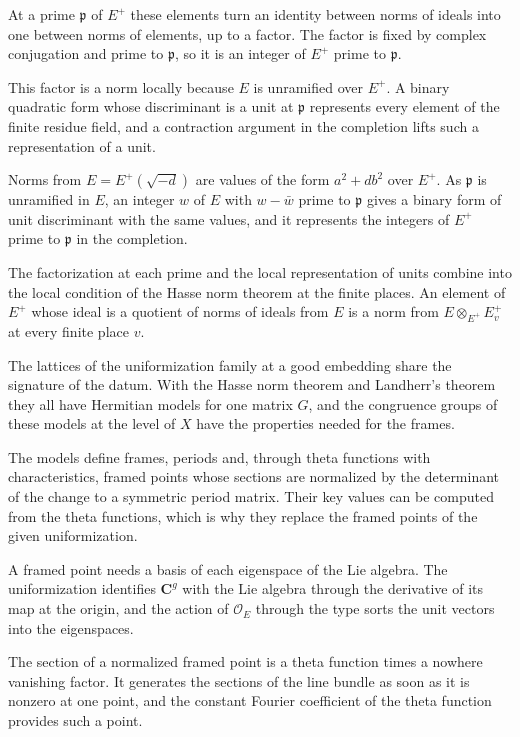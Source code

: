 At a prime $\mathfrak p$ of $E^+$ these elements turn an identity between norms of ideals into one between norms of
elements, up to a factor. The factor is fixed by complex conjugation and prime to $\mathfrak p$, so it is an integer of
$E^+$ prime to $\mathfrak p$.

This factor is a norm locally because $E$ is unramified over $E^+$. A binary quadratic form whose discriminant is a unit
at $\mathfrak p$ represents every element of the finite residue field, and a contraction argument in the completion
lifts such a representation of a unit.

Norms from $E=E^+(\sqrt{-d})$ are values of the form $a^2+db^2$ over $E^+$. As $\mathfrak p$ is unramified in $E$, an
integer $w$ of $E$ with $w-\bar w$ prime to $\mathfrak p$ gives a binary form of unit discriminant with the same values,
and it represents the integers of $E^+$ prime to $\mathfrak p$ in the completion.

The factorization at each prime and the local representation of units combine into the local condition of the Hasse
norm theorem at the finite places. An element of $E^+$ whose ideal is a quotient of norms of ideals from $E$ is a norm
from $E\otimes_{E^+}E^+_v$ at every finite place $v$.

The lattices of the uniformization family at a good embedding share the signature of the datum. With the Hasse norm
theorem and Landherr's theorem they all have Hermitian models for one matrix $G$, and the congruence groups of these
models at the level of $X$ have the properties needed for the frames.

The models define frames, periods and, through theta functions with characteristics, framed points whose sections
are normalized by the determinant of the change to a symmetric period matrix. Their key values can be computed
from the theta functions, which is why they replace the framed points of the given uniformization.

A framed point needs a basis of each eigenspace of the Lie algebra. The uniformization identifies $\mathbf C^g$ with
the Lie algebra through the derivative of its map at the origin, and the action of $\mathcal O_E$ through the type
sorts the unit vectors into the eigenspaces.

The section of a normalized framed point is a theta function times a nowhere vanishing factor. It generates the
sections of the line bundle as soon as it is nonzero at one point, and the constant Fourier coefficient of the theta
function provides such a point.

